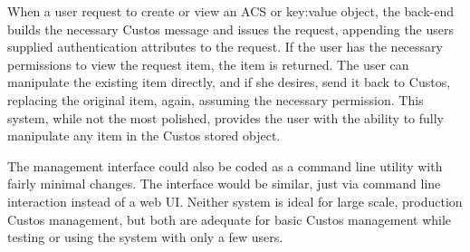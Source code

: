 When a user request to create or view an ACS or key:value object, the
back-end builds the necessary Custos message and issues the request,
appending the users supplied authentication attributes to the
request. If the user has the necessary permissions to view the request
item, the item is returned. The user can manipulate the existing item
directly, and if she desires, send it back to Custos, replacing the
original item, again, assuming the necessary permission. This system,
while not the most polished, provides the user with the ability to
fully manipulate any item in the Custos stored object.

The management interface could also be coded as a command line utility
with fairly minimal changes. The interface would be similar, just via
command line interaction instead of a web UI. Neither system is ideal
for large scale, production Custos management, but both are adequate
for basic Custos management while testing or using the system with
only a few users.

